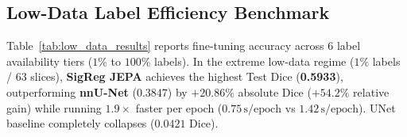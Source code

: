 \documentclass{article}
\begin{document}
\begin{table}[ht]
\centering
\caption{Full-data empirical benchmark comparison of throughput, latency, representation collapse probes, and downstream segmentation metrics on 2D multi-modal BraTS Glioma MRI. Best per column is formatted in \textbf{bold}.}
\label{tab:benchmark_results}
\vspace{0.5em}
\end{table}

\subsection{Low-Data Label Efficiency Benchmark}
Table~\ref{tab:low_data_results} reports fine-tuning accuracy across 6 label availability tiers ($1\%$ to $100\%$ labels). In the extreme low-data regime ($1\%$ labels / $63$ slices), \textbf{SigReg JEPA} achieves the highest Test Dice (\textbf{0.5933}), outperforming \textbf{nnU-Net} ($0.3847$) by $+20.86\%$ absolute Dice ($+54.2\%$ relative gain) while running $1.9\times$ faster per epoch ($0.75\,\text{s/epoch}$ vs $1.42\,\text{s/epoch}$). UNet baseline completely collapses ($0.0421$ Dice).
\end{document}
